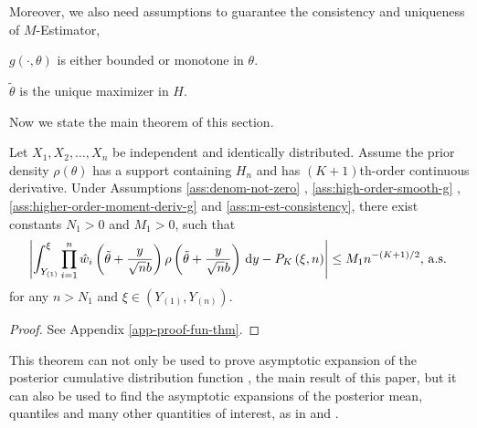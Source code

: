 Moreover, we also need  assumptions to guarantee the consistency and uniqueness of $M$-Estimator,
\begin{assumption}
\label{ass:m-est-consistency}
$g\left(\cdot,\theta\right)$ is either bounded or monotone in $\theta$.
\end{assumption}
\begin{assumption}
\label{ass:m-est-unique}
$\tilde{\theta}$ is the unique maximizer in $H$.
\end{assumption} 
Now we state the main theorem of this section.
\begin{theorem}
\label{thm:main-thm}Let $X_{1},X_{2},\ldots,X_{n}$ be independent and identically distributed.   %
Assume the prior density $\rho\left(\theta\right)$ has a support containing
$H_n$ and has $\left(K+1\right)$th-order continuous derivative. Under Assumptions \ref{ass:denom-not-zero} , \ref{ass:high-order-smooth-g} ,\ref{ass:higher-order-moment-deriv-g} and \ref{ass:m-est-consistency},  there
exist constants $N_{1}>0$ and $M_{1}>0$, such that 
\begin{equation}
\left|\int_{Y_{\left(1\right)}}^{\xi}\prod_{i=1}^{n}\hat{w}_{i}\left(\tilde{\theta}+\frac{y}{\sqrt{n}b}\right)\rho\left(\tilde{\theta}+\frac{y}{\sqrt{n}b}\right)\,\mathrm{d} y-P_{K}\left(\xi,n\right)\right|\le M_{1}n^{-\left(K+1\right)/2},\,\mathrm{a.s.}\,\label{eq:fund-exp-formula}
\end{equation}
for any $n>N_{1}$ and $\xi\in\left(Y_{\left(1\right)},Y_{\left(n\right)}\right)$. \end{theorem}
\begin{proof}
See Appendix \ref{app-proof-fun-thm}.
\end{proof}
This theorem can not only be used to prove asymptotic expansion of
the posterior cumulative distribution function , the main result of this
paper, but it can also be used to find the asymptotic expansions of the
posterior mean, quantiles and many other quantities of interest, as in \cite{johnson1970asymptotic}
and \cite{vexler2014posterior} . 

